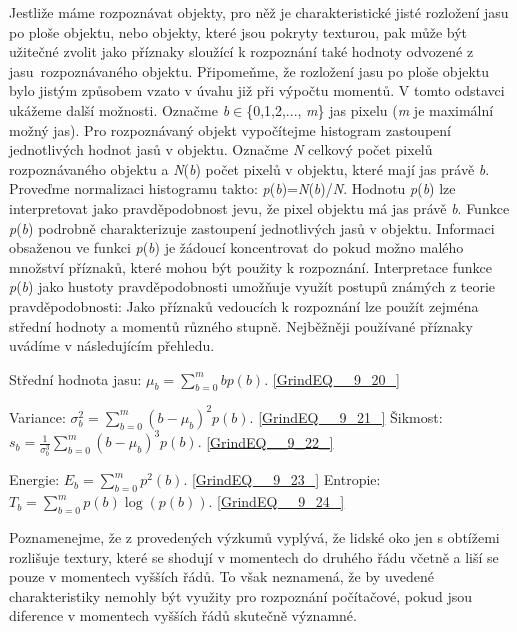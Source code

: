 \noindent Jestliže máme rozpoznávat objekty, pro něž je charakteristické jisté rozložení jasu po ploše objektu, nebo objekty, které jsou pokryty texturou, pak může být užitečné zvolit jako příznaky sloužící k rozpoznání také hodnoty odvozené z jasu~rozpoznávaného objektu. Připomeňme, že rozložení jasu po ploše objektu bylo jistým způsobem vzato v úvahu již při výpočtu momentů. V tomto odstavci ukážeme další možnosti. Označme \textit{b}$\in$\{0,1,2,..., \textit{m}\} jas pixelu (\textit{m} je maximální možný jas). Pro rozpoznávaný objekt vypočítejme histogram zastoupení jednotlivých hodnot jasů v objektu. Označme \textit{N} celkový počet pixelů rozpoznávaného objektu a \textit{N}(\textit{b}) počet pixelů v objektu, které mají jas právě \textit{b}. Proveďme normalizaci histogramu takto: \textit{p}(\textit{b})=\textit{N}(\textit{b})/\textit{N}. Hodnotu \textit{p}(\textit{b}) lze interpretovat jako pravděpodobnost jevu, že pixel objektu má jas právě \textit{b}. Funkce \textit{p}(\textit{b}) podrobně charakterizuje zastoupení jednotlivých jasů v objektu. Informaci obsaženou ve funkci \textit{p}(\textit{b}) je žádoucí koncentrovat do pokud možno malého množství příznaků, které mohou být použity k rozpoznání. Interpretace funkce \textit{p}(\textit{b}) jako hustoty pravděpodobnosti umožňuje využít postupů známých z teorie pravděpodobnosti: Jako příznaků vedoucích k rozpoznání lze použít zejména střední hodnoty a momentů různého stupně. Nejběžněji používané příznaky uvádíme v následujícím přehledu.

\noindent Střední hodnota jasu: $\mu _{b} =\sum _{b=0}^{m}bp\left(b\right) $. \eqref{GrindEQ__9_20_}

\noindent Variance: $\sigma _{b}^{2} =\sum _{b=0}^{m}\left(b-\mu _{b} \right)^{2} p\left(b\right) $. \eqref{GrindEQ__9_21_} Šikmost: $s_{b} =\frac{1}{\sigma _{b}^{3} } \sum _{b=0}^{m}\left(b-\mu _{b} \right)^{3} p\left(b\right) .$ \eqref{GrindEQ__9_22_}

\noindent Energie: $E_{b} =\sum _{b=0}^{m}p^{2} \left(b\right) $. \eqref{GrindEQ__9_23_} Entropie: $T_{b} =\sum _{b=0}^{m}p\left(b\right)\log \left(p\left(b\right)\right) $. \eqref{GrindEQ__9_24_}

\noindent Poznamenejme, že z provedených výzkumů vyplývá, že lidské oko jen s obtížemi rozlišuje textury, které se shodují v momentech do druhého řádu včetně a liší se pouze v momentech vyšších řádů. To však neznamená, že by uvedené charakteristiky nemohly být využity pro rozpoznání počítačové, pokud jsou diference v momentech vyšších řádů skutečně významné.

